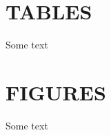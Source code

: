 \documentclass[letterpaper,12pt]{article}
\begin{document}
\clearpage
\section*{TABLES}
\par Some text




\clearpage
\begin{singlespace}


\end{singlespace}




\clearpage
\section*{FIGURES}
\par Some text
\end{document}
